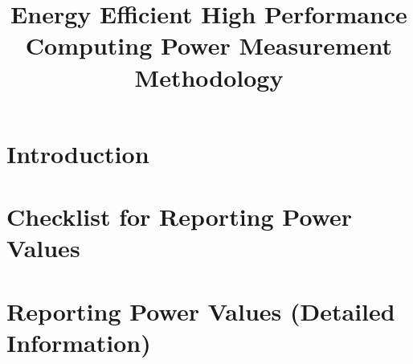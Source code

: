 \documentclass[runningheads]{scrreprt}
\begin{document}
\pagestyle{headings}  %

\title{
Energy Efficient High Performance Computing Power Measurement Methodology
}


\date{ }
\maketitle              %

\tableofcontents
\listoftables

%
\chapter{Introduction}

\label{sec:intro}

\chapter{Checklist for Reporting Power Values}

\label{sec:checklist}

\chapter{Reporting Power Values (Detailed Information)}

\label{sec:reporting}
\newpage
\end{document}
